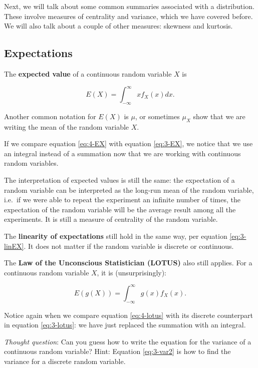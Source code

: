 \documentclass[
]{book}
\begin{document}
Next, we will talk about some common summaries associated with a distribution. These involve measures of centrality and variance, which we have covered before. We will also talk about a couple of other measures: skewness and kurtosis.

\subsection{Expectations}\label{expectations-1}

The \textbf{expected value} of a continuous random variable \(X\) is

\begin{equation} 
E(X) = \int_{-\infty}^{\infty} x f_X(x) dx.
\label{eq:4-EX}
\end{equation}

Another common notation for \(E(X)\) is \(\mu\), or sometimes \(\mu_X\) show that we are writing the mean of the random variable \(X\).

If we compare equation \eqref{eq:4-EX} with equation \eqref{eq:3-EX}, we notice that we use an integral instead of a summation now that we are working with continuous random variables.

The interpretation of expected values is still the same: the expectation of a random variable can be interpreted as the long-run mean of the random variable, i.e.~if we were able to repeat the experiment an infinite number of times, the expectation of the random variable will be the average result among all the experiments. It is still a measure of centrality of the random variable.

The \textbf{linearity of expectations} still hold in the same way, per equation \eqref{eq:3-linEX}. It does not matter if the random variable is discrete or continuous.

The \textbf{Law of the Unconscious Statistician (LOTUS)} also still applies. For a continuous random variable \(X\), it is (unsurprisingly):

\begin{equation} 
E(g(X)) = \int_{-\infty}^{\infty} g(x) f_X(x).
\label{eq:4-lotus}
\end{equation}

Notice again when we compare equation \eqref{eq:4-lotus} with its discrete counterpart in equation \eqref{eq:3-lotus}: we have just replaced the summation with an integral.

\emph{Thought question}: Can you guess how to write the equation for the variance of a continuous random variable? Hint: Equation \eqref{eq:3-var2} is how to find the variance for a discrete random variable.
\end{document}
